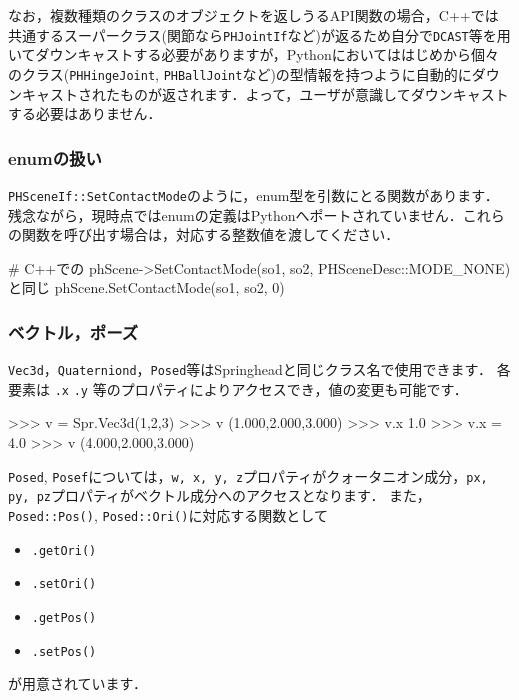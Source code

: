\KLUDGE なお，複数種類のクラスのオブジェクトを返しうるAPI\KLUDGE 関数の場合，C++\KLUDGE では共通するスーパークラス(\KLUDGE 関節なら\texttt{PHJointIf}\KLUDGE など)\KLUDGE が返るため自分で\texttt{DCAST}\KLUDGE 等を用いてダウンキャストする必要がありますが，Python\KLUDGE においてははじめから個々のクラス(\texttt{PHHingeJoint}, \texttt{PHBallJoint}\KLUDGE など)\KLUDGE の型情報を持つように自動的にダウンキャストされたものが返されます．よって，ユーザが意識してダウンキャストする必要はありません．


\subsubsection*{enum\KLUDGE の扱い}

\texttt{PHSceneIf::SetContactMode}\KLUDGE のように，enum\KLUDGE 型を引数にとる関数があります．
\KLUDGE 残念ながら，現時点ではenum\KLUDGE の定義はPython\KLUDGE へポートされていません．これらの関数を呼び出す場合は，対応する整数値を渡してください．
\begin{sourcecode}
# C++での phScene->SetContactMode(so1, so2, PHSceneDesc::MODE_NONE) と同じ
phScene.SetContactMode(so1, so2, 0)
\end{sourcecode}


\subsubsection*{\KLUDGE ベクトル，ポーズ}

\texttt{Vec3d}\KLUDGE ，\texttt{Quaterniond}\KLUDGE ，\texttt{Posed}\KLUDGE 等はSpringhead\KLUDGE と同じクラス名で使用できます．
\KLUDGE 各要素は \texttt{.x} \texttt{.y} \KLUDGE 等のプロパティによりアクセスでき，値の変更も可能です．

\begin{sourcecode}
>>> v = Spr.Vec3d(1,2,3)
>>> v
(1.000,2.000,3.000)
>>> v.x
1.0
>>> v.x = 4.0
>>> v
(4.000,2.000,3.000)
\end{sourcecode}

\texttt{Posed}, \texttt{Posef}\KLUDGE については，\texttt{w, x, y, z}\KLUDGE プロパティがクォータニオン成分，\texttt{px, py, pz}\KLUDGE プロパティがベクトル成分へのアクセスとなります．
\KLUDGE また，\texttt{Posed::Pos()}, \texttt{Posed::Ori()}\KLUDGE に対応する関数として
\begin{itemize}
\item \texttt{.getOri()}
\item \texttt{.setOri()}
\item \texttt{.getPos()}
\item \texttt{.setPos()}
\end{itemize}
\KLUDGE が用意されています．



